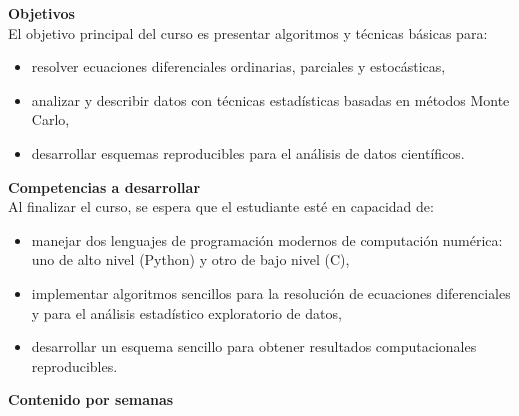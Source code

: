 \documentclass[letterpaper,10pt,onecolumn]{article}
\begin{document}
\noindent\textbf{\large {} \quad Objetivos}\\[-0.2cm]

\noindent\normalsize El objetivo principal del curso es presentar
algoritmos y t\'ecnicas b\'asicas para:

\begin{itemize}
\item resolver ecuaciones
  diferenciales ordinarias, parciales y estoc\'asticas, \\[-0.6cm]
\item analizar y describir datos con t\'ecnicas estad\'isticas basadas
  en m\'etodos Monte Carlo, \\[-0.6cm]
\item desarrollar esquemas reproducibles para el an\'alisis de datos cient\'ificos. \\[-0.6cm]
\end{itemize}

\noindent\textbf{\large {} \quad Competencias a
  desarrollar}\\[-0.2cm] 


\noindent\normalsize Al finalizar el curso, se espera que el
estudiante est\'e en capacidad de: 

\begin{itemize}
\item manejar dos lenguajes de programaci\'on modernos de
  computaci\'on num\'erica: uno de alto
  nivel (Python) y otro de bajo nivel (C),\\[-0.6cm] 
\item implementar algoritmos sencillos para la resoluci\'on de
  ecuaciones diferenciales y para el an\'alisis estad\'istico
  exploratorio de datos, \\[-0.6cm]   
\item desarrollar un esquema sencillo para obtener resultados
  computacionales reproducibles.\\[-0.6cm]  
\end{itemize}

\noindent\textbf{\large {} \quad Contenido por
  semanas}\\[-0.2cm]  

\end{document}
